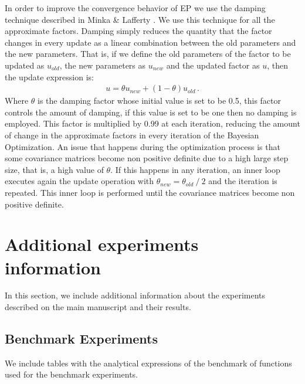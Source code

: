 In order to improve the convergence behavior of EP we use the damping technique described in Minka \& Lafferty \cite{minka2012expectation}. We use this technique for all the approximate factors. Damping simply reduces the quantity that the factor changes in every update as a linear combination between the old parameters and the new parameters. That is, if we define the old parameters of the factor to be updated as $u_{old}$, the new parameters as $u_{new}$ and the updated factor as $u$, then the update expression is:
\begin{align}
    u = \theta u_{new} + (1-\theta)u_{old}\,.
\end{align}
Where $\theta$ is the damping factor whose initial value is set to be 0.5, this factor controls the amount of damping, if this value is set to be one then no damping is employed. This factor is multiplied by 0.99 at each iteration, reducing the amount of change in the approximate factors in every iteration of the Bayesian Optimization. An issue that happens during the optimization process is that some covariance matrices become non positive definite due to a high large step size, that is, a high value of $\theta$. If this happens in any iteration, an inner loop executes again the update operation with $\theta_{new} = \theta_{old}\ /\ 2$ and the iteration is repeated. This inner loop is performed until the covariance matrices become non positive definite.

\section{Additional experiments information}
In this section, we include additional information about the experiments described on the main manuscript and their results.

\subsection{Benchmark Experiments}
We include tables with the analytical expressions of the benchmark of functions used for the benchmark experiments.

